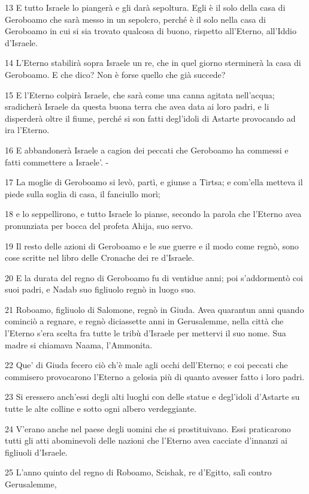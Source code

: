 \par 13 E tutto Israele lo piangerà e gli darà sepoltura. Egli è il solo della casa di Geroboamo che sarà messo in un sepolcro, perché è il solo nella casa di Geroboamo in cui si sia trovato qualcosa di buono, rispetto all'Eterno, all'Iddio d'Israele.
\par 14 L'Eterno stabilirà sopra Israele un re, che in quel giorno sterminerà la casa di Geroboamo. E che dico? Non è forse quello che già succede?
\par 15 E l'Eterno colpirà Israele, che sarà come una canna agitata nell'acqua; sradicherà Israele da questa buona terra che avea data ai loro padri, e li disperderà oltre il fiume, perché si son fatti degl'idoli di Astarte provocando ad ira l'Eterno.
\par 16 E abbandonerà Israele a cagion dei peccati che Geroboamo ha commessi e fatti commettere a Israele'. -
\par 17 La moglie di Geroboamo si levò, partì, e giunse a Tirtsa; e com'ella metteva il piede sulla soglia di casa, il fanciullo morì;
\par 18 e lo seppellirono, e tutto Israele lo pianse, secondo la parola che l'Eterno avea pronunziata per bocca del profeta Ahija, suo servo.
\par 19 Il resto delle azioni di Geroboamo e le sue guerre e il modo come regnò, sono cose scritte nel libro delle Cronache dei re d'Israele.
\par 20 E la durata del regno di Geroboamo fu di ventidue anni; poi s'addormentò coi suoi padri, e Nadab suo figliuolo regnò in luogo suo.
\par 21 Roboamo, figliuolo di Salomone, regnò in Giuda. Avea quarantun anni quando cominciò a regnare, e regnò diciassette anni in Gerusalemme, nella città che l'Eterno s'era scelta fra tutte le tribù d'Israele per mettervi il suo nome. Sua madre si chiamava Naama, l'Ammonita.
\par 22 Que' di Giuda fecero ciò ch'è male agli occhi dell'Eterno; e coi peccati che commisero provocarono l'Eterno a gelosia più di quanto avesser fatto i loro padri.
\par 23 Si eressero anch'essi degli alti luoghi con delle statue e degl'idoli d'Astarte su tutte le alte colline e sotto ogni albero verdeggiante.
\par 24 V'erano anche nel paese degli uomini che si prostituivano. Essi praticarono tutti gli atti abominevoli delle nazioni che l'Eterno avea cacciate d'innanzi ai figliuoli d'Israele.
\par 25 L'anno quinto del regno di Roboamo, Scishak, re d'Egitto, salì contro Gerusalemme,
